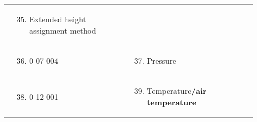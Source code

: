 \begin{longtable}[]{@{}llll@{}}
\begin{minipage}[t]{0.22\columnwidth}
\end{minipage} & \begin{minipage}[t]{0.22\columnwidth}\raggedright
\begin{enumerate}
\setcounter{enumi}{34}
\item
  Extended height assignment method
\end{enumerate}\strut
\end{minipage} & \begin{minipage}[t]{0.22\columnwidth}\raggedright
\strut
\end{minipage}\tabularnewline
\begin{minipage}[t]{0.22\columnwidth}\raggedright
\strut
\end{minipage} & \begin{minipage}[t]{0.22\columnwidth}\raggedright
\begin{enumerate}
\setcounter{enumi}{35}
\item
  0 07 004
\end{enumerate}\strut
\end{minipage} & \begin{minipage}[t]{0.22\columnwidth}\raggedright
\begin{enumerate}
\setcounter{enumi}{36}
\item
  Pressure
\end{enumerate}\strut
\end{minipage} & \begin{minipage}[t]{0.22\columnwidth}\raggedright
\strut
\end{minipage}\tabularnewline
\begin{minipage}[t]{0.22\columnwidth}\raggedright
\strut
\end{minipage} & \begin{minipage}[t]{0.22\columnwidth}\raggedright
\begin{enumerate}
\setcounter{enumi}{37}
\item
  0 12 001
\end{enumerate}\strut
\end{minipage} & \begin{minipage}[t]{0.22\columnwidth}\raggedright
\begin{enumerate}
\setcounter{enumi}{38}
\item
  Temperature\textbf{/air temperature}
\end{enumerate}\strut
\end{minipage} & \begin{minipage}[t]{0.22\columnwidth}\raggedright
\strut
\end{minipage}\tabularnewline

\end{longtable}
